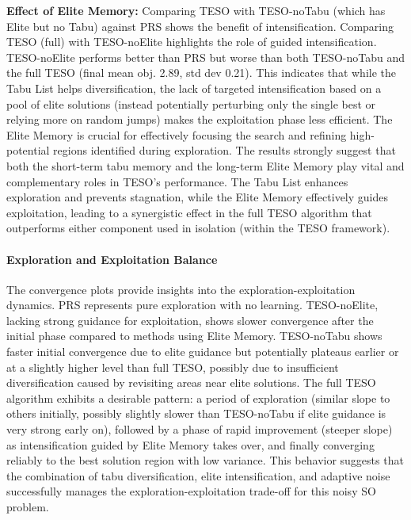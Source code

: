 \documentclass{article}
\begin{document}
\noindent\textbf{Effect of Elite Memory:} Comparing TESO with TESO-noTabu (which has Elite but no Tabu) against PRS shows the benefit of intensification. Comparing TESO (full) with TESO-noElite highlights the role of guided intensification. TESO-noElite performs better than PRS but worse than both TESO-noTabu and the full TESO (final mean obj. 2.89, std dev 0.21). This indicates that while the Tabu List helps diversification, the lack of targeted intensification based on a pool of elite solutions (instead potentially perturbing only the single best or relying more on random jumps) makes the exploitation phase less efficient. The Elite Memory is crucial for effectively focusing the search and refining high-potential regions identified during exploration.
The results strongly suggest that both the short-term tabu memory and the long-term Elite Memory play vital and complementary roles in TESO's performance. The Tabu List enhances exploration and prevents stagnation, while the Elite Memory effectively guides exploitation, leading to a synergistic effect in the full TESO algorithm that outperforms either component used in isolation (within the TESO framework).

\paragraph{Exploration and Exploitation Balance}
The convergence plots provide insights into the exploration-exploitation dynamics. PRS represents pure exploration with no learning. TESO-noElite, lacking strong guidance for exploitation, shows slower convergence after the initial phase compared to methods using Elite Memory. TESO-noTabu shows faster initial convergence due to elite guidance but potentially plateaus earlier or at a slightly higher level than full TESO, possibly due to insufficient diversification caused by revisiting areas near elite solutions. The full TESO algorithm exhibits a desirable pattern: a period of exploration (similar slope to others initially, possibly slightly slower than TESO-noTabu if elite guidance is very strong early on), followed by a phase of rapid improvement (steeper slope) as intensification guided by Elite Memory takes over, and finally converging reliably to the best solution region with low variance. This behavior suggests that the combination of tabu diversification, elite intensification, and adaptive noise successfully manages the exploration-exploitation trade-off for this noisy SO problem.
\end{document}
